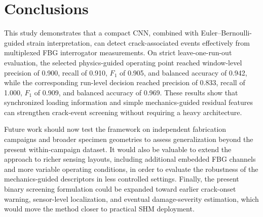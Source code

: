 \documentclass[notspecified,article,submit,pdftex,moreauthors]{Definitions/mdpi}
\begin{document}
\section{Conclusions}

This study demonstrates that a compact CNN, combined with Euler--Bernoulli-guided strain interpretation, can detect crack-associated events effectively from multiplexed FBG interrogator measurements. On strict leave-one-run-out evaluation, the selected physics-guided operating point reached window-level precision of 0.900, recall of 0.910, $F_1$ of 0.905, and balanced accuracy of 0.942, while the corresponding run-level decision reached precision of 0.833, recall of 1.000, $F_1$ of 0.909, and balanced accuracy of 0.969. These results show that synchronized loading information and simple mechanics-guided residual features can strengthen crack-event screening without requiring a heavy architecture.

Future work should now test the framework on independent fabrication campaigns and broader specimen geometries to assess generalization beyond the present within-campaign dataset. It would also be valuable to extend the approach to richer sensing layouts, including additional embedded FBG channels and more variable operating conditions, in order to evaluate the robustness of the mechanics-guided descriptors in less controlled settings. Finally, the present binary screening formulation could be expanded toward earlier crack-onset warning, sensor-level localization, and eventual damage-severity estimation, which would move the method closer to practical SHM deployment.


\end{document}
